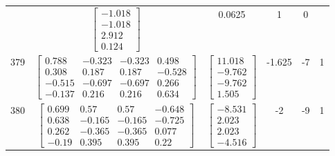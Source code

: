\documentclass[a4paper,12pt]{article}
\begin{document}
\begin{tabular}{c c c c c c}
&
$\begin{bmatrix} -1.018 \\ -1.018 \\ 2.912 \\ 0.124 \end{bmatrix}$
&
0.0625
&
1
&
0
\\
379
&
$\begin{bmatrix} 0.788 & -0.323 & -0.323 & 0.498 \\ 0.308 & 0.187 & 0.187 & -0.528 \\ -0.515 & -0.697 & -0.697 & 0.266 \\ -0.137 & 0.216 & 0.216 & 0.634 \end{bmatrix}$
&
$\begin{bmatrix} 11.018 \\ -9.762 \\ -9.762 \\ 1.505 \end{bmatrix}$
&
-1.625
&
-7
&
1
\\
380
&
$\begin{bmatrix} 0.699 & 0.57 & 0.57 & -0.648 \\ 0.638 & -0.165 & -0.165 & -0.725 \\ 0.262 & -0.365 & -0.365 & 0.077 \\ -0.19 & 0.395 & 0.395 & 0.22 \end{bmatrix}$
&
$\begin{bmatrix} -8.531 \\ 2.023 \\ 2.023 \\ -4.516 \end{bmatrix}$
&
-2
&
-9
&
1
\\
\end{tabular} \egroup \newpage
\end{document}
